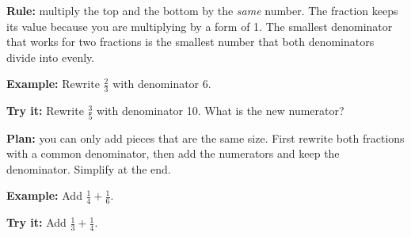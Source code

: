 \documentclass[12pt]{article}
\begin{document}


\begin{formulabox}
\textbf{Rule:} multiply the top and the bottom by the \emph{same} number.
The fraction keeps its value because you are multiplying by a form of 1.
The smallest denominator that works for two fractions is the smallest number
that both denominators divide into evenly.
\end{formulabox}

\begin{examplebox}
\textbf{Example:} \quad Rewrite $\tfrac{2}{3}$ with denominator 6.
\end{examplebox}

\begin{tryitbox}
\textbf{Try it:} \quad Rewrite $\tfrac{3}{5}$ with denominator 10. What is the
new numerator?\\[2pt]
\end{tryitbox}


\begin{formulabox}
\textbf{Plan:} you can only add pieces that are the same size.
First rewrite both fractions with a common denominator, then add the
numerators and keep the denominator. Simplify at the end.
\end{formulabox}

\begin{examplebox}
\textbf{Example:} \quad Add $\tfrac{1}{4} + \tfrac{1}{6}$.
\end{examplebox}

\begin{tryitbox}
\textbf{Try it:} \quad Add $\tfrac{1}{3} + \tfrac{1}{4}$.\\[2pt]
\end{tryitbox}
\end{document}
